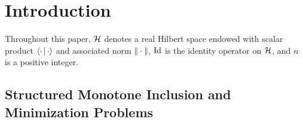 \newcommand{\Ademi}{\Aa\pa{ \half }}

\newcommand{\bgaA}{\bga {\scriptscriptstyle \! \bullet \!} \bA}
\newcommand{\infga}{\underline{\ga}}
\newcommand{\supga}{\overline{\ga}}

\newcommand{\PS}{P_{\bSs}}
\newcommand{\PSp}{P_{\bSs^\bot}}
\newcommand{\RS}{R_{\bSs}}
\newcommand{\JgA}{J_{\bgaA}}
\newcommand{\RgA}{R_{\bgaA}}
\newcommand{\JgAi}{J_{\!\frac{\ga}{w_i}\!A_i}}
\newcommand{\RgAi}{R_{\!\frac{\ga}{w_i}\!A_i}}
\newcommand{\JgiAi}{J_{\!\ga_i\!A_i}}
\newcommand{\RgiAi}{R_{\!\ga_i\!A_i}}

\newcommand{\Tb}{\bT_{1,\bga}}
\newcommand{\Tf}{\bT_{2,\ga}}
\newcommand{\bBJ}{\bB\PS}
\newcommand{\Apga}{\bA_{\bga}\prim}
\newcommand{\Apgat}{\bA_{\bga_k}\prim}
\newcommand{\Apgainf}{\bA_{\bgainf}\prim}
\newcommand{\projS}{\PS}
\newcommand{\projP}{\PSp}
\newcommand{\pSs}[1]{{#1}^{\bSs}}
\newcommand{\pSp}[1]{{#1}^{\boldsymbol \bot}}
\newcommand{\Fx}{\mathbf{F}}

\newcommand{\musp}{\mu}
\newcommand{\mutv}{\nu}
\newcommand{\normbk}[1]{\norm{#1}_{1,2}^{\Bb}}
\newcommand{\normtv}[1]{\norm{#1}_{\mathrm{TV}}}
\newcommand{\normbki}[1]{\norm{#1}_{1,2}^{\Bb_i}}
\newcommand{\normbktv}[1]{\norm{#1}_{1,2}^{\Bb_{\mathrm{TV}}}}

\newcommand{\RNN}{\Ii}
\newcommand{\RNJ}{\Ii^J}
\newcommand{\RG}{\Ii^2}
\newcommand{\Ks}{K}
\newcommand{\Mr}{M}

\newcommand{\gradient}{\grad}

\newcommand{\GFB}{\textsc{GFB}\xspace}
\newcommand{\DR}{\textsc{DR}\xspace}
\newcommand{\ChPo}{\textsc{ChPo}\xspace}
\newcommand{\CoPe}{\textsc{CoPe}\xspace}
\newcommand{\HPE}{\textsc{HPE}\xspace}

\section{Introduction}

Throughout this paper, $\mathcal{H}$ denotes a real Hilbert space endowed with scalar product $\left\langle \cdot\,\middle|\,\cdot\right\rangle$ and associated norm $|\kern-1pt| \cdot |\kern-1pt|$, $\operatorname{Id}$ is the identity operator on $\mathcal{H}$, and $n$ is a positive integer.

\subsection{Structured Monotone Inclusion and Minimization Problems}

